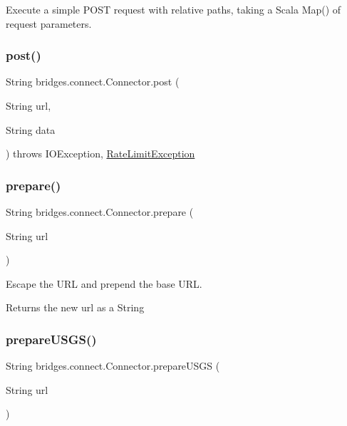 Execute a simple P\+O\+ST request with relative paths, taking a Scala Map() of request parameters. \mbox{\label{classbridges_1_1connect_1_1_connector_a4b8978743a8c230b86500f5a00cb2697}} 
\subsubsection{\texorpdfstring{post()}{post()}\hspace{0.1cm}{\footnotesize\ttfamily [2/2]}}
{\footnotesize\ttfamily String bridges.\+connect.\+Connector.\+post (\begin{DoxyParamCaption}\item[{String}]{url,  }\item[{String}]{data }\end{DoxyParamCaption}) throws I\+O\+Exception, 		\mbox{\hyperlink{classbridges_1_1validation_1_1_rate_limit_exception}{Rate\+Limit\+Exception}}}

\mbox{\label{classbridges_1_1connect_1_1_connector_a507ee5a9d8c812ffd4629cbd22f27373}} 
\subsubsection{\texorpdfstring{prepare()}{prepare()}}
{\footnotesize\ttfamily String bridges.\+connect.\+Connector.\+prepare (\begin{DoxyParamCaption}\item[{String}]{url }\end{DoxyParamCaption})}

Escape the U\+RL and prepend the base U\+RL. \begin{DoxyReturn}{Returns}
the new url as a String 
\end{DoxyReturn}
\mbox{\label{classbridges_1_1connect_1_1_connector_aa0201e2569358ff906d3c14d654711e5}} 
\subsubsection{\texorpdfstring{prepareUSGS()}{prepareUSGS()}}
{\footnotesize\ttfamily String bridges.\+connect.\+Connector.\+prepare\+U\+S\+GS (\begin{DoxyParamCaption}\item[{String}]{url }\end{DoxyParamCaption})}

